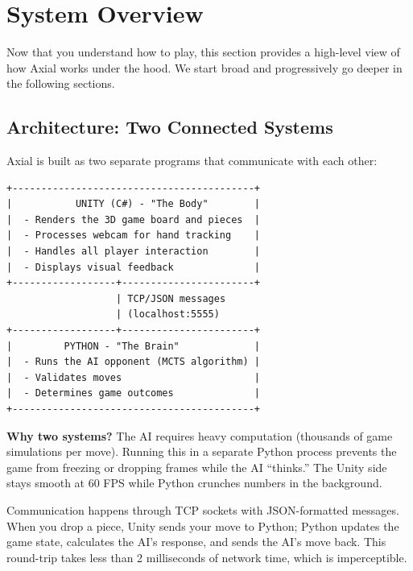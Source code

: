 \documentclass[11pt]{article}
\begin{document}
\section{System Overview}

Now that you understand how to play, this section provides a high-level view of how Axial works under the hood. We start broad and progressively go deeper in the following sections.

\subsection{Architecture: Two Connected Systems}

Axial is built as two separate programs that communicate with each other:

\begin{verbatim}
+------------------------------------------+
|           UNITY (C#) - "The Body"        |
|  - Renders the 3D game board and pieces  |
|  - Processes webcam for hand tracking    |
|  - Handles all player interaction        |
|  - Displays visual feedback              |
+------------------+-----------------------+
                   | TCP/JSON messages
                   | (localhost:5555)
+------------------+-----------------------+
|         PYTHON - "The Brain"             |
|  - Runs the AI opponent (MCTS algorithm) |
|  - Validates moves                       |
|  - Determines game outcomes              |
+------------------------------------------+
\end{verbatim}

\textbf{Why two systems?} The AI requires heavy computation (thousands of game simulations per move). Running this in a separate Python process prevents the game from freezing or dropping frames while the AI ``thinks.'' The Unity side stays smooth at 60 FPS while Python crunches numbers in the background.

Communication happens through TCP sockets with JSON-formatted messages. When you drop a piece, Unity sends your move to Python; Python updates the game state, calculates the AI's response, and sends the AI's move back. This round-trip takes less than 2 milliseconds of network time, which is imperceptible.

\end{document}
